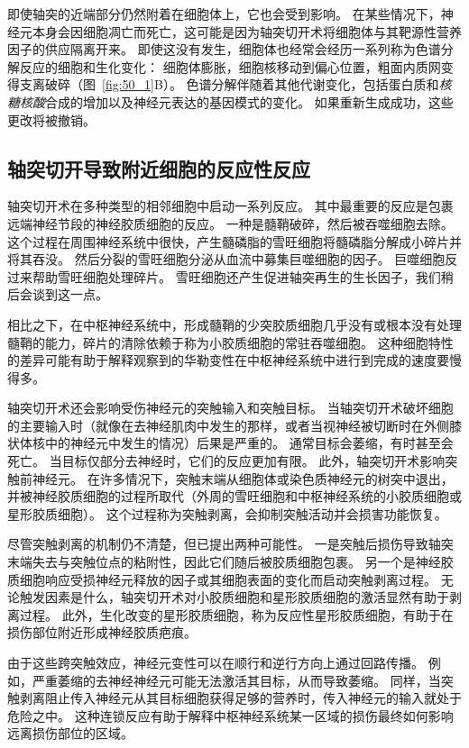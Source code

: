 即使轴突的近端部分仍然附着在细胞体上，它也会受到影响。
在某些情况下，神经元本身会因细胞凋亡而死亡，这可能是因为轴突切开术将细胞体与其靶源性营养因子的供应隔离开来。
即使这没有发生，细胞体也经常会经历一系列称为色谱分解反应的细胞和生化变化：
细胞体膨胀，细胞核移动到偏心位置，粗面内质网变得支离破碎（图~\ref{fig:50_1}B）。
色谱分解伴随着其他代谢变化，包括蛋白质和\textit{核糖核酸}合成的增加以及神经元表达的基因模式的变化。
如果重新生成成功，这些更改将被撤销。



\subsection{轴突切开导致附近细胞的反应性反应}

轴突切开术在多种类型的相邻细胞中启动一系列反应。
其中最重要的反应是包裹远端神经节段的神经胶质细胞的反应。
一种是髓鞘破碎，然后被吞噬细胞去除。
这个过程在周围神经系统中很快，产生髓磷脂的雪旺细胞将髓磷脂分解成小碎片并将其吞没。
然后分裂的雪旺细胞分泌从血流中募集巨噬细胞的因子。
巨噬细胞反过来帮助雪旺细胞处理碎片。
雪旺细胞还产生促进轴突再生的生长因子，我们稍后会谈到这一点。


相比之下，在中枢神经系统中，形成髓鞘的少突胶质细胞几乎没有或根本没有处理髓鞘的能力，碎片的清除依赖于称为小胶质细胞的常驻吞噬细胞。
这种细胞特性的差异可能有助于解释观察到的华勒变性在中枢神经系统中进行到完成的速度要慢得多。


轴突切开术还会影响受伤神经元的突触输入和突触目标。
当轴突切开术破坏细胞的主要输入时（就像在去神经肌肉中发生的那样，或者当视神经被切断时在外侧膝状体核中的神经元中发生的情况）后果是严重的。
通常目标会萎缩，有时甚至会死亡。
当目标仅部分去神经时，它们的反应更加有限。
此外，轴突切开术影响突触前神经元。
在许多情况下，突触末端从细胞体或染色质神经元的树突中退出，并被神经胶质细胞的过程所取代（外周的雪旺细胞和中枢神经系统的小胶质细胞或星形胶质细胞）。
这个过程称为突触剥离，会抑制突触活动并会损害功能恢复。


尽管突触剥离的机制仍不清楚，但已提出两种可能性。
一是突触后损伤导致轴突末端失去与突触位点的粘附性，因此它们随后被胶质细胞包裹。
另一个是神经胶质细胞响应受损神经元释放的因子或其细胞表面的变化而启动突触剥离过程。
无论触发因素是什么，轴突切开术对小胶质细胞和星形胶质细胞的激活显然有助于剥离过程。
此外，生化改变的星形胶质细胞，称为反应性星形胶质细胞，有助于在损伤部位附近形成神经胶质疤痕。


由于这些跨突触效应，神经元变性可以在顺行和逆行方向上通过回路传播。
例如，严重萎缩的去神经神经元可能无法激活其目标，从而导致萎缩。
同样，当突触剥离阻止传入神经元从其目标细胞获得足够的营养时，传入神经元的输入就处于危险之中。
这种连锁反应有助于解释中枢神经系统某一区域的损伤最终如何影响远离损伤部位的区域。



